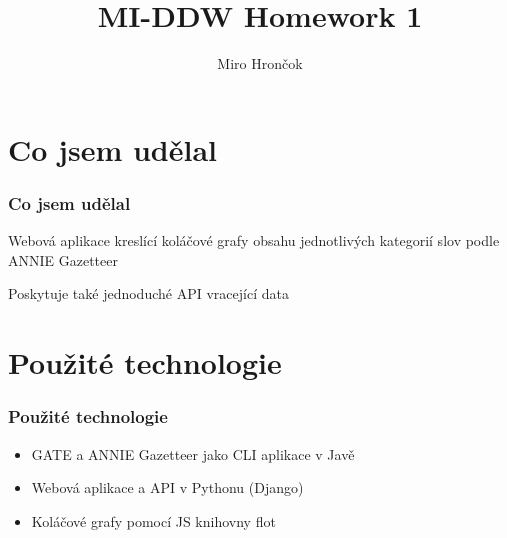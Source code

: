 \documentclass{beamer}
\title{MI-DDW Homework 1}
\author{Miro Hrončok}
\institute[FIT]{FIT ČVUT v Praze}
\begin{document}
\begin{frame}
  \titlepage
\end{frame}



\section{Co jsem udělal}

\begin{frame}
  \frametitle{Co jsem udělal}
    Webová aplikace kreslící koláčové grafy obsahu jednotlivých kategorií slov podle ANNIE Gazetteer
    
    Poskytuje také jednoduché API vracející data
\end{frame}

\section{Použité technologie}

\begin{frame}
  \frametitle{Použité technologie}
  \begin{itemize}
    \item GATE a ANNIE Gazetteer jako CLI aplikace v Javě
    \item Webová aplikace a API v Pythonu (Django)
    \item Koláčové grafy pomocí JS knihovny flot
  \end{itemize}
\end{frame}
\end{document}
